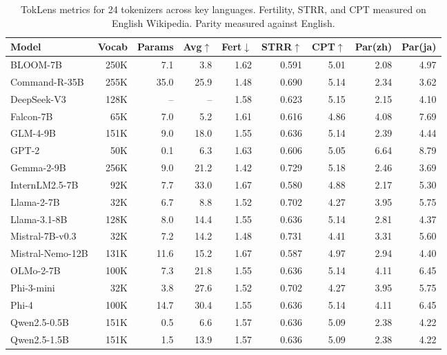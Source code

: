 \begin{table}[t]
\centering
\caption{TokLens metrics for 24 tokenizers across key languages. Fertility, STRR, and CPT measured on English Wikipedia. Parity measured against English.}
\label{tab:metrics}
\small
\begin{tabular}{lrrrrrrrr}
\toprule
Model & Vocab & Params & Avg\(\uparrow\) & Fert\(\downarrow\) & STRR\(\uparrow\) & CPT\(\uparrow\) & Par(zh) & Par(ja) \\
\midrule
BLOOM-7B               & 250K &   7.1 &   3.8 & 1.62 & 0.591 & 5.01 & 2.08 & 4.97 \\
Command-R-35B          & 255K &  35.0 &  25.9 & 1.48 & 0.690 & 5.14 & 2.34 & 3.62 \\
DeepSeek-V3            & 128K &    -- &    -- & 1.58 & 0.623 & 5.15 & 2.15 & 4.10 \\
Falcon-7B              &  65K &   7.0 &   5.2 & 1.61 & 0.616 & 4.86 & 4.08 & 7.69 \\
GLM-4-9B               & 151K &   9.0 &  18.0 & 1.55 & 0.636 & 5.14 & 2.39 & 4.44 \\
GPT-2                  &  50K &   0.1 &   6.3 & 1.63 & 0.606 & 5.05 & 6.64 & 8.79 \\
Gemma-2-9B             & 256K &   9.0 &  21.2 & 1.42 & 0.729 & 5.18 & 2.46 & 3.69 \\
InternLM2.5-7B         &  92K &   7.7 &  33.0 & 1.67 & 0.580 & 4.88 & 2.17 & 5.30 \\
Llama-2-7B             &  32K &   6.7 &   8.8 & 1.52 & 0.702 & 4.27 & 3.95 & 5.75 \\
Llama-3.1-8B           & 128K &   8.0 &  14.4 & 1.55 & 0.636 & 5.14 & 2.81 & 4.37 \\
Mistral-7B-v0.3        &  32K &   7.2 &  14.2 & 1.48 & 0.731 & 4.41 & 3.31 & 5.60 \\
Mistral-Nemo-12B       & 131K &  11.6 &  15.2 & 1.67 & 0.587 & 4.97 & 2.94 & 4.40 \\
OLMo-2-7B              & 100K &   7.3 &  21.8 & 1.55 & 0.636 & 5.14 & 4.11 & 6.45 \\
Phi-3-mini             &  32K &   3.8 &  27.6 & 1.52 & 0.702 & 4.27 & 3.95 & 5.75 \\
Phi-4                  & 100K &  14.7 &  30.4 & 1.55 & 0.636 & 5.14 & 4.11 & 6.45 \\
Qwen2.5-0.5B           & 151K &   0.5 &   6.6 & 1.57 & 0.636 & 5.09 & 2.38 & 4.22 \\
Qwen2.5-1.5B           & 151K &   1.5 &  13.9 & 1.57 & 0.636 & 5.09 & 2.38 & 4.22 \\

\end{tabular}
\end{table}
